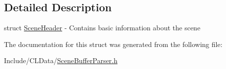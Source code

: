 \subsection{Detailed Description}
struct \hyperlink{struct_scene_header}{Scene\+Header} -\/ Contains basic information about the scene 

The documentation for this struct was generated from the following file\+:\begin{DoxyCompactItemize}
\item 
Include/\+C\+L\+Data/\hyperlink{_scene_buffer_parser_8h}{Scene\+Buffer\+Parser.\+h}\end{DoxyCompactItemize}
